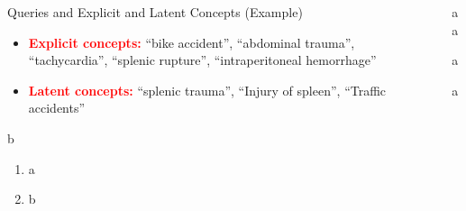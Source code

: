\documentclass[final]{beamer}
\newlength{\sepwid}
\newlength{\onecolwid}
\newlength{\twocolwid}
\begin{document}
\begin{frame}[t]
\begin{columns}[t]
\begin{column}{\onecolwid}
\begin{block}{Queries and Explicit and Latent Concepts (Example)}
\begin{itemize}
\item  \textcolor{red}{\textbf{Explicit concepts:}} ``bike accident'', ``abdominal trauma'', ``tachycardia'', ``splenic rupture'', ``intraperitoneal hemorrhage''

\item  \textcolor{red}{\textbf{Latent concepts:}}
  ``splenic trauma'', ``Injury of spleen'', ``Traffic accidents''


\end{itemize}
\end{block}



\begin{block}{b}
\begin{enumerate}
\item a

\item b

\end{enumerate}

\end{block}





\end{column} %

\begin{column}{\sepwid}\end{column} %

\begin{column}{\twocolwid} %


\begin{alertblock}{a}
a
\end{alertblock}

\begin{alertblock}{a}

a

\end{alertblock}

\begin{columns}[t,totalwidth=\twocolwid] %

\begin{column}{\onecolwid}\vspace{-.6in} %


\end{column}
\end{columns}
\end{column}
\end{columns}
\end{frame}
\end{document}
